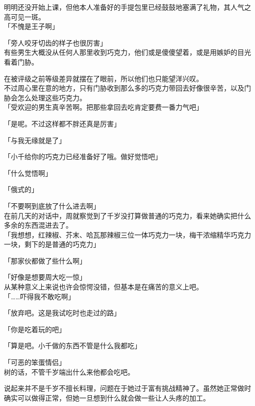 明明还没开始上课，但他本人准备好的手提包里已经鼓鼓地塞满了礼物，其人气之高可见一斑。\\

「不愧是王子啊」

「旁人咬牙切齿的样子也很厉害」\\

有些男生大概没从任何人那里收到巧克力，他们或是傻傻望着，或是用嫉妒的目光看着门胁。

在被评级之前等级差异就摆在了眼前，所以他们也只能望洋兴叹。\\

不过周心里在意的地方，只有门胁收到那么多的巧克力带回去好像很辛苦，以及门胁会怎么处理这些巧克力。\\

「受欢迎的男生真辛苦啊。把那些拿回去吃肯定要费一番力气吧」

「是呢。不过这样都不胖还真是厉害」

「与我无缘就是了」

「小千给你的巧克力已经准备好了哦。做好觉悟吧」

「什么觉悟啊」

「俄式的」

「不要啊到底放了什么进去啊」\\

在前几天的对话中，周就察觉到了千岁没打算做普通的巧克力，看来她确实把什么多余的东西混进去了。\\

「我想想，红辣椒、芥末、哈瓦那辣椒三位一体巧克力一块，梅干浓缩精华巧克力一块，剩下的是普通的巧克力」

「那家伙都做了些什么啊」

「好像是想要周大吃一惊」\\

从某种意义上来说也许会惊愕没错，但基本是在痛苦的意义上吧。\\

「……吓得我不敢吃啊」

「放弃吧。这是我试吃时也走过的路」

「你是吃着玩的吧」

「算是吧。小千做的东西不管是什么我都吃」

「可恶的笨蛋情侣」\\

树的话，不管千岁端出什么来他都会吃吧。

说起来并不是千岁不擅长料理，问题在于她过于富有挑战精神了。虽然她正常做时确实可以做得正常，但她一旦想到什么就会做一些让人头疼的加工。

